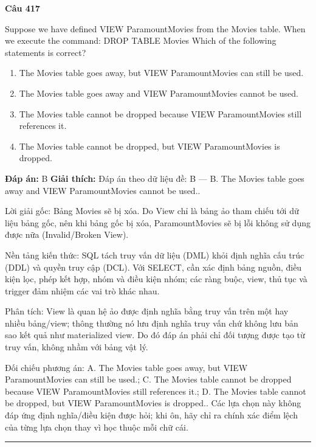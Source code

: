 \documentclass[11pt,a4paper]{article}
\newenvironment{question}[1]{%
  \par\vspace{1em}\noindent\textbf{\large Câu #1}\par\vspace{0.4em}
}{%
  \par\vspace{1em}\hrule\vspace{0.6em}
}
\newenvironment{choices}{%
  \begin{enumerate}[label=\textbf{\Alph*.},leftmargin=2.2em,itemsep=2pt,topsep=3pt]
}{%
  \end{enumerate}
}
\newcommand{\choice}{\item}
\begin{document}
\begin{question}{417}
Suppose we have defined VIEW ParamountMovies from the Movies table. When we execute the command: DROP TABLE Movies Which of the following statements is correct?
\begin{choices}
\choice The Movies table goes away, but VIEW ParamountMovies can still be used.
\choice The Movies table goes away and VIEW ParamountMovies cannot be used.
\choice The Movies table cannot be dropped because VIEW ParamountMovies still references it.
\choice The Movies table cannot be dropped, but VIEW ParamountMovies is dropped.
\end{choices}
\textbf{Đáp án:} B
\textbf{Giải thích:} Đáp án theo dữ liệu đề: B — B. The Movies table goes away and VIEW ParamountMovies cannot be used..

Lời giải gốc: Bảng Movies sẽ bị xóa. Do View chỉ là bảng ảo tham chiếu tới dữ liệu bảng gốc, nên khi bảng gốc bị xóa, ParamountMovies sẽ bị lỗi không sử dụng được nữa (Invalid/Broken View).

Nền tảng kiến thức: SQL tách truy vấn dữ liệu (DML) khỏi định nghĩa cấu trúc (DDL) và quyền truy cập (DCL). Với SELECT, cần xác định bảng nguồn, điều kiện lọc, phép kết hợp, nhóm và điều kiện nhóm; các ràng buộc, view, thủ tục và trigger đảm nhiệm các vai trò khác nhau.

Phân tích: View là quan hệ ảo được định nghĩa bằng truy vấn trên một hay nhiều bảng/view; thông thường nó lưu định nghĩa truy vấn chứ không lưu bản sao kết quả như materialized view. Do đó đáp án phải chỉ đối tượng được tạo từ truy vấn, không nhầm với bảng vật lý.

Đối chiếu phương án: A. The Movies table goes away, but VIEW ParamountMovies can still be used.; C. The Movies table cannot be dropped because VIEW ParamountMovies still references it.; D. The Movies table cannot be dropped, but VIEW ParamountMovies is dropped.. Các lựa chọn này không đáp ứng định nghĩa/điều kiện được hỏi; khi ôn, hãy chỉ ra chính xác điểm lệch của từng lựa chọn thay vì học thuộc mỗi chữ cái.
\end{question}
\end{document}
